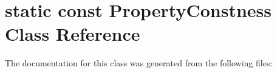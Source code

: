 \hypertarget{classstatic_01const_01PropertyConstness}{}\section{static const Property\+Constness Class Reference}
\label{classstatic_01const_01PropertyConstness}


The documentation for this class was generated from the following files\+: